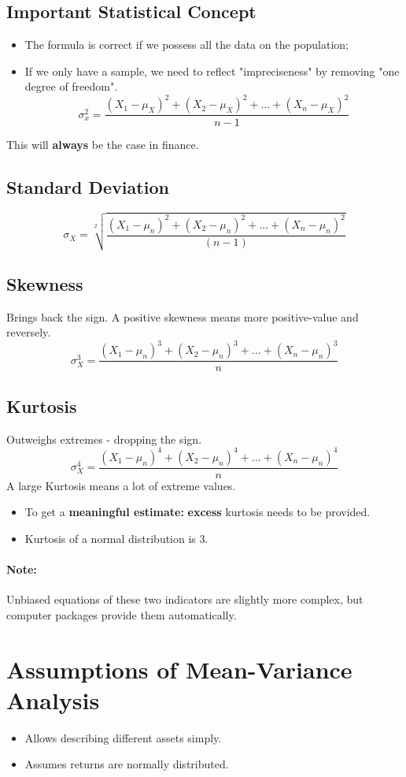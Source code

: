\documentclass[11pt,a4paper]{report}
\begin{document}
\subsection{Important Statistical Concept}
\begin{itemize}
    \item The formula is correct if we possess all the data on the population;
    \item If we only have a sample, we need to reflect "impreciseness" by removing "one degree of freedom".
    \[\sigma_x^2 = \frac{(X_1 - \mu_X)^2 + (X_2 - \mu_X)^2 + ... + (X_n - \mu_X)^2}{n-1}\]
\end{itemize}
This will \textbf{always} be the case in finance.

\subsection{Standard Deviation}
\[\sigma_X = \sqrt[2]{\frac{(X_1 - \mu_n)^2 + (X_2 - \mu_n)^2 + ... + (X_n - \mu_n)^2}{(n-1)}} \]

\subsection{Skewness}
Brings back the sign. A positive skewness means more positive-value and reversely.
\[\sigma_X^3 = \frac{(X_1 - \mu_n)^3 + (X_2 - \mu_n)^3 + ... + (X_n - \mu_n)^3}{n} \]

\subsection{Kurtosis}
Outweighs extremes - dropping the sign.
\[\sigma_X^4 = \frac{(X_1 - \mu_n)^4 + (X_2 - \mu_n)^4 + ... + (X_n - \mu_n)^4}{n} \]
A large Kurtosis means a lot of extreme values.
\begin{itemize}
    \item To get a \textbf{meaningful estimate:} \textbf{excess} kurtosis needs to be provided.
    \item Kurtosis of a normal distribution is 3.
\end{itemize}

\paragraph{Note:} Unbiased equations of these two indicators are slightly more complex, but computer packages provide them automatically.

\section{Assumptions of Mean-Variance Analysis}
\begin{itemize}
    \item Allows describing different assets simply.
    \item Assumes returns are normally distributed.
\end{itemize}
\end{document}
